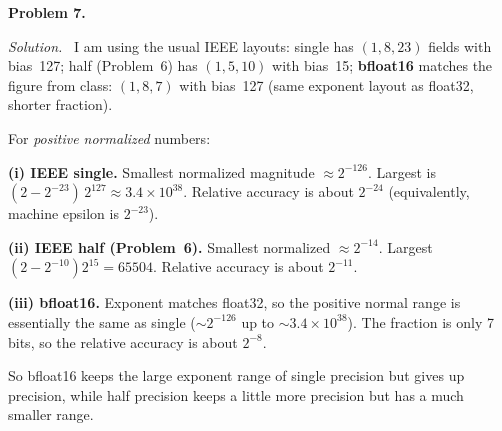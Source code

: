\documentclass[12pt]{article}
\newcommand{\problem}[1]{\vspace{0.8em}\noindent\textbf{Problem #1.}\vspace{0.35em}}
\newenvironment{solution}{\par\noindent\textit{Solution.}\ }{\par\vspace{1.1em}}
\begin{document}
\problem{7}
\begin{solution}
I am using the usual IEEE layouts: single has $(1,8,23)$ fields with bias~127; half (Problem~6) has $(1,5,10)$ with bias~15; \textbf{bfloat16} matches the figure from class: $(1,8,7)$ with bias~127 (same exponent layout as float32, shorter fraction).

For \emph{positive normalized} numbers:

\medskip
\noindent\textbf{(i) IEEE single.} Smallest normalized magnitude $\approx 2^{-126}$. Largest is $(2-2^{-23})\,2^{127}\approx 3.4\times 10^{38}$. Relative accuracy is about $2^{-24}$ (equivalently, machine epsilon is $2^{-23}$).

\medskip
\noindent\textbf{(ii) IEEE half (Problem~6).} Smallest normalized $\approx 2^{-14}$. Largest $(2-2^{-10})2^{15}=65504$. Relative accuracy is about $2^{-11}$.

\medskip
\noindent\textbf{(iii) bfloat16.} Exponent matches float32, so the positive normal range is essentially the same as single ($\sim 2^{-126}$ up to $\sim 3.4\times 10^{38}$). The fraction is only 7 bits, so the relative accuracy is about $2^{-8}$.

So bfloat16 keeps the large exponent range of single precision but gives up precision, while half precision keeps a little more precision but has a much smaller range.
\end{solution}
\end{document}
